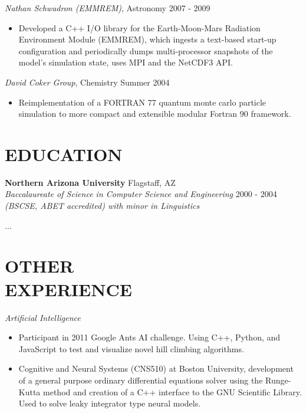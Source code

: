 \documentclass[line,margin]{res}
\begin{document}
\begin{resume}
          {\sl Nathan Schwadron (EMMREM)}, Astronomy \hfill 2007 - 2009
          \begin{itemize} \itemsep -2pt
          \item
            Developed a C++ I/O library for the Earth-Moon-Mars Radiation Environment Module (EMMREM), which ingests a text-based start-up configuration and periodically dumps multi-processor snapshots of the model's simulation state, uses MPI and the NetCDF3 API.
          \end{itemize}

          {\sl David Coker Group}, Chemistry \hfill Summer 2004
          \begin{itemize} \itemsep -2pt
          \item
            Reimplementation of a FORTRAN 77 quantum monte carlo particle simulation to more compact and extensible modular Fortran 90 framework.
          \end{itemize}

  \section{EDUCATION}
          {\bf Northern Arizona University} \hfill Flagstaff, AZ\\
          {\sl Baccalaureate of Science in Computer Science and Engineering} \hfill 2000 - 2004\\
          {\sl (BSCSE, ABET accredited) with minor in Linguistics}

          ...
  \section{OTHER\\EXPERIENCE}
          \emph{Artificial Intelligence}
          \begin{itemize} \itemsep -2pt
          \item
            Participant in 2011 Google Ants AI challenge. Using C++, Python, and JavaScript to test
            and visualize novel hill climbing algorithms.
          \item
            Cognitive and Neural Systems (CNS510) at Boston University,
            development of a general purpose ordinary differential equations solver using the Runge-Kutta
            method and creation of a C++ interface to the GNU Scientific Library. Used to solve leaky
            integrator type neural models.
          \end{itemize}


\end{resume}
\end{document}
